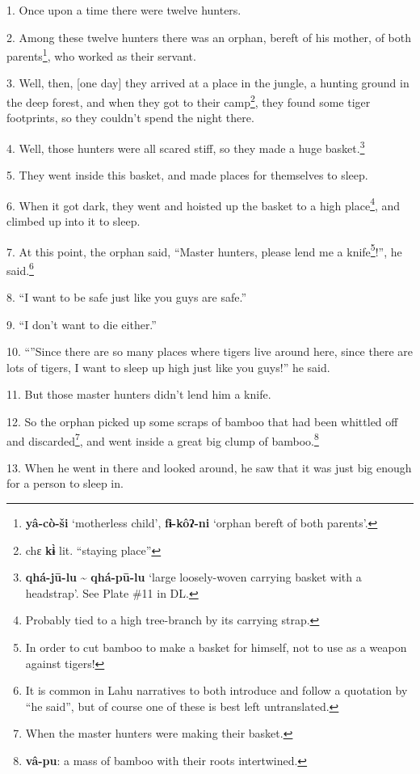 \setcounter{footnote}{0}

1. Once upon a time there were twelve hunters.

2. Among these twelve hunters there was an orphan, bereft of his mother, of both
parents\footnote{\textbf{yâ-cò-ši} `motherless child', \textbf{fɨ-kôʔ-ni} `orphan bereft of both parents'.}, who worked as their servant.

3. Well, then, [one day] they arrived at a place in the jungle, a hunting ground
in the deep forest, and when they got to their camp\footnote{chɛ \textbf{kɨ̀} lit. ``staying place''}, they found some tiger
footprints, so they couldn't spend the night there.

4. Well, those hunters were all scared stiff, so they made a huge basket.\footnote{\textbf{qhá-jū-lu} \textasciitilde{} \textbf{qhá-pū-lu} `large loosely-woven carrying basket with a headstrap'. See Plate \#11 in DL.}

5. They went inside this basket, and made places for themselves to sleep.

6. When it got dark, they went and hoisted up the basket to a high place\footnote{Probably tied to a high tree-branch by its carrying strap.}, and
climbed up into it to sleep.

7. At this point, the orphan said, ``Master hunters, please lend me a knife\footnote{In order to cut bamboo to make a basket for himself, not to use as a weapon against tigers!}!'',
he said.\footnote{It is common in Lahu narratives to both introduce and follow a quotation by ``he said'', but of course one of these is best left untranslated.}

8. ``I want to be safe just like you guys are safe.''

9. ``I don't want to die either.''

10. ``''Since there are so many places where tigers live around here, since
there are lots of tigers, I want to sleep up high just like you guys!'' he said.

11. But those master hunters didn't lend him a knife.

12. So the orphan picked up some scraps of bamboo that had been whittled off and
discarded\footnote{When the master hunters were making their basket.}, and went inside a great big clump of bamboo.\footnote{\textbf{vâ-pu}: a mass of bamboo with their roots intertwined.}

13. When he went in there and looked around, he saw that it was just big enough
for a person to sleep in.

